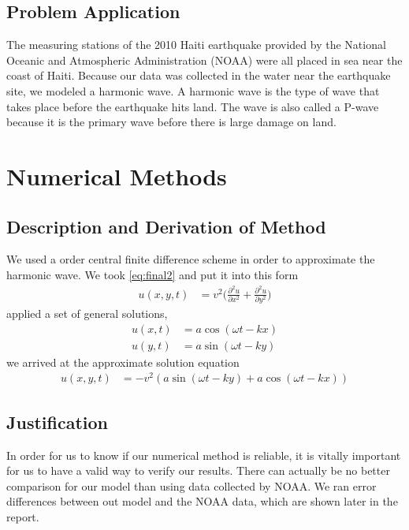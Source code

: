 \documentclass[conf]{new-aiaa}
\begin{document}
\subsection{Problem Application}
The measuring stations of the 2010 Haiti earthquake provided by the National Oceanic and Atmospheric Administration (NOAA) were all placed in sea near the coast of Haiti. Because our data was collected in the water near the earthquake site, we modeled a harmonic wave. A harmonic wave is the type of wave that takes place before the earthquake hits land. The wave is also called a P-wave because it is the primary wave before there is large damage on land.

\section{Numerical Methods}
\subsection{Description and Derivation of Method}
We used a  order central finite difference scheme in order to approximate the harmonic wave. We took \cref{eq:final2} and put it into this form
\begin{align}
    u(x,y,t) &= v^2 \Bigg(\frac{\partial^2 u}{\partial x^2}+ \frac{\partial^2 u}{\partial y^2}\Bigg)
\end{align}
applied a set of general solutions,
\begin{align}
    u(x,t) &= a \cos(\omega t - kx)\\
    u(y,t) &= a \sin(\omega t - ky)
\end{align}
we arrived at the approximate solution equation
\begin{align}
    u(x,y,t) &= -v^2(a \sin(\omega t - ky) + a \cos(\omega t - kx))
\end{align}
\subsection{Justification}
In order for us to know if our numerical method is reliable, it is vitally important for us to have a valid way to verify our results. There can actually be no better comparison for our model than using data collected by NOAA. We ran error differences between out model and the NOAA data, which are shown later in the report.
\end{document}

